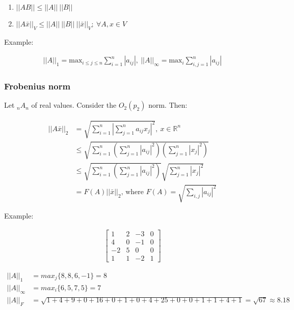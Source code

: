 \begin{enumerate}
  \item $||AB|| \leq ||A||\ ||B||$
  \item $||A\bar{x}||_V \leq ||A||\ ||B||\ ||\bar{x}||_V;\ \forall A, x \in V$
\end{enumerate}

Example:

\begin{align*}
  ||A||_1 = \text{max}_{i \leq j \leq n} \sum_{i=1}^{n} |a_{ij}|,\
  ||A||_\infty = \text{max}_i \sum_{i,j=1}^n |a_{ij}|
\end{align*}

\subsubsection{Frobenius norm}

Let ${}_{n}A_{n}$ of real values. Consider the $O_2(p_2)$ norm. Then:

\begin{align*}
  ||A\bar{x}||_2 & = \sqrt{\sum_{i=1}^n | \sum_{j=1}^n a_{ij} x_j |^2},\ x \in \mathbb{R}^n \\
                 & \leq \sqrt{\sum_{i=1}^n ( \sum_{j=1}^n |a_{ij}|^2 ) (\sum_{j=1}^n |x_j|^2)} \\
                 & \leq \sqrt{\sum_{i=1}^n ( \sum_{j=1}^n |a_{ij}|^2 )} \sqrt{\sum_{j=1}^n |x_j|^2} \\
                 & = F(A) ||\bar{x}||_2\text{, where } F(A) = \sqrt{\sum_{i,j} |a_{ij}|^2}
\end{align*}

Example:

\begin{align*}
  \begin{bmatrix}
    1 & 2 & -3 & 0 \\
    4 & 0 & -1 & 0 \\
    -2 & 5 & 0 & 0 \\
    1 & 1 & -2 & 1
  \end{bmatrix}
\end{align*}

\begin{align*}
  ||A||_1 &= max_j \{8, 8, 6, -1\} = 8 \\
  ||A||_\infty &= max_i \{6, 5, 7, 5\} = 7 \\
  ||A||_F &= \sqrt{1 + 4 + 9 + 0 + 16 + 0 + 1 + 0 + 4 + 25 + 0 + 0 + 1 + 1 + 4 + 1} = \sqrt{67} \approx \mathbf{8.18}
\end{align*}


